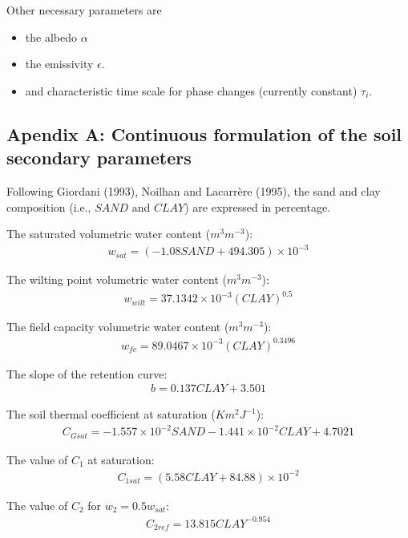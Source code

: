 Other necessary parameters are
\begin{itemize}
\item the albedo $\alpha$
\item the emissivity $\epsilon$.
\item and characteristic time scale for phase changes (currently constant) $\tau_i$.
\end{itemize}


\subsection{Apendix A: Continuous formulation of the soil secondary parameters}
Following Giordani (1993), Noilhan and Lacarr\`ere (1995),
the sand and clay composition (i.e., $SAND$ and $CLAY$) are
expressed in percentage.

\bigskip

The saturated volumetric water content ($m^3 m^{-3}$):
\begin{eqnarray}
w_{sat} =  ( -1.08 SAND + 494.305 ) \times 10^{-3}
\end{eqnarray}

The wilting point volumetric water content ($m^3 m^{-3}$):
\begin{eqnarray}
w_{wilt} = 37.1342 \times 10^{-3} (CLAY)^{0.5}
\end{eqnarray}

The field capacity volumetric water content ($m^3 m^{-3}$):
\begin{eqnarray}
w_{fc} = 89.0467 \times 10^{-3} (CLAY)^{0.3496}
\end{eqnarray}

The slope of the retention curve:
\begin{eqnarray}
b = 0.137 CLAY + 3.501
\end{eqnarray}

The soil thermal coefficient at saturation ($K m^2 J^{-1}$):
\begin{eqnarray}
C_{Gsat} = -1.557 \times 10^{-2} SAND -1.441 \times 10^{-2} CLAY
+ 4.7021
\end{eqnarray}

The value of $C_1$ at saturation:
\begin{eqnarray}
C_{1sat} = (5.58 CLAY + 84.88) \times 10^{-2}
\end{eqnarray}

The value of $C_2$ for $w_2=0.5 w_{sat}$:
\begin{eqnarray}
C_{2ref} = 13.815 CLAY^{-0.954}
\end{eqnarray}

